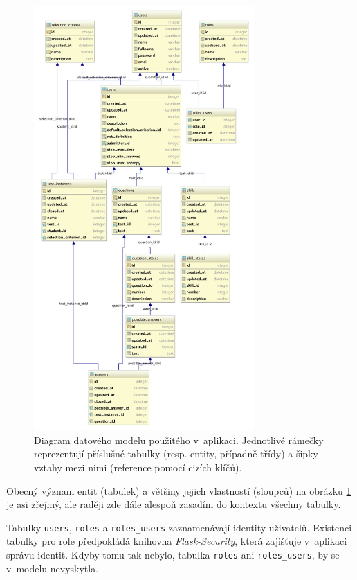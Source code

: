 \documentclass[a4paper,twoside,12pt]{scrbook}
\begin{document}
\begin{figure}
  \centering
    \includegraphics[width=0.75\textwidth]{data_model.pdf}
  \caption{Diagram datového modelu použitého v~aplikaci. Jednotlivé rámečky reprezentují příslušné tabulky (resp. entity, případně třídy) a šipky vztahy mezi nimi (reference pomocí cizích klíčů).}
  \label{fig:data_model}
\end{figure}

Obecný význam entit (tabulek) a většiny jejich vlastností (sloupců) na obrázku \ref{fig:data_model} je asi zřejmý, ale raději zde dále alespoň zasadím do kontextu všechny tabulky.

Tabulky \texttt{users}, \texttt{roles} a \texttt{roles\_users} zaznamenávají identity uživatelů. Existenci tabulky pro role předpokládá knihovna \textit{Flask-Security}, která zajišťuje v~aplikaci správu identit. Kdyby tomu tak nebylo, tabulka \texttt{roles} ani \texttt{roles\_users}, by se v~modelu nevyskytla. \cite{Flask-Security}
\end{document}
